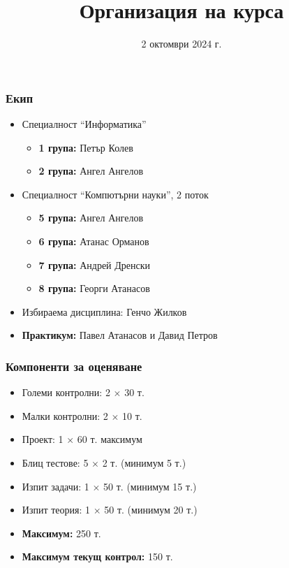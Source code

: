 \documentclass[alsotrans,beameroptions={aspectratio=169}]{beamerswitch}
\title{Организация на курса}
\date{2 октомври 2024 г.}
\begin{document}
\begin{frame}
  \titlepage
\end{frame}

\begin{frame}
  \frametitle{Екип}

  \begin{itemize}
  \item Специалност ``Информатика''
    \begin{itemize}
    \item \textbf{1 група:} Петър Колев
    \item \textbf{2 група:} Ангел Ангелов
    \end{itemize}
  \item Специалност ``Компютърни науки'', 2 поток
    \begin{itemize}
    \item \textbf{5 група:} Ангел Ангелов
    \item \textbf{6 група:} Атанас Орманов
    \item \textbf{7 група:} Андрей Дренски
    \item \textbf{8 група:} Георги Атанасов
    \end{itemize}
  \item Избираема дисциплина: Генчо Жилков
  \item \textbf{Практикум:} Павел Атанасов и Давид Петров
\end{itemize}
\end{frame}

\begin{frame}
  \frametitle{Компоненти за оценяване}

  \begin{itemize}
  \item Големи контролни: 2 $\times$ 30 т.
  \item Малки контролни: 2 $\times$ 10 т.
  \item Проект: 1 $\times$ 60 т. максимум
  \item Блиц тестове: 5 $\times$ 2 т. \alert{(минимум 5 т.)}
  \item Изпит задачи: 1 $\times$ 50 т. \alert{(минимум 15 т.)}
  \item Изпит теория: 1 $\times$ 50 т. \alert{(минимум 20 т.)}
  \item \textbf{Максимум:} 250 т.
  \item \textbf{Максимум текущ контрол:} 150 т.
  \end{itemize}
\end{frame}
\end{document}
